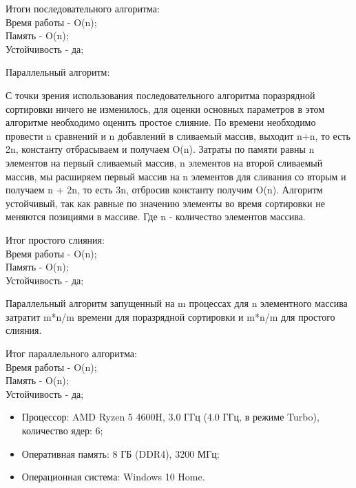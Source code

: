 \documentclass{report}
\begin{document}
\begin{center}
Итоги последовательного алгоритма: \\
Время работы - O(n); \\
Память - O(n); \\
Устойчивость - да;
\end{center}

\newpage

Параллельный алгоритм:
\par С точки зрения использования последовательного алгоритма поразрядной сортировки ничего не изменилось, для оценки основных параметров в этом алгоритме необходимо оценить простое слияние.
По времени необходимо провести n сравнений и n добавлений в сливаемый массив, выходит n+n, то есть 2n, константу отбрасываем и получаем O(n).
Затраты по памяти равны n элементов на первый сливаемый массив, n элементов на второй сливаемый массив, мы расширяем первый массив на n элементов для сливания со вторым и получаем n + 2n, то есть 3n, отбросив константу получим O(n).
Алгоритм устойчивый, так как равные по значению элементы во время сортировки не меняются позициями в массиве. Где n - количество элементов массива.

\begin{center}
Итог простого слияния: \\
Время работы - O(n); \\
Память - O(n); \\
Устойчивость - да;
\end{center}

\vspace{4em}

\par Параллельный алгоритм запущенный на m процессах для n элементного массива затратит m*n/m времени для поразрядной сортировки и m*n/m для простого слияния.

\begin{center}
Итог параллельного алгоритма: \\
Время работы - O(n); \\
Память - O(n); \\
Устойчивость - да;
\end{center}

\newpage

\begin{itemize}
\item Процессор: AMD Ryzen 5 4600H, 3.0 ГГц (4.0 ГГц, в режиме Turbo), количество ядер: 6;
\item Оперативная память: 8 ГБ (DDR4), 3200 МГц;
\item Операционная система: Windows 10 Home.
\end{itemize}
\end{document}
